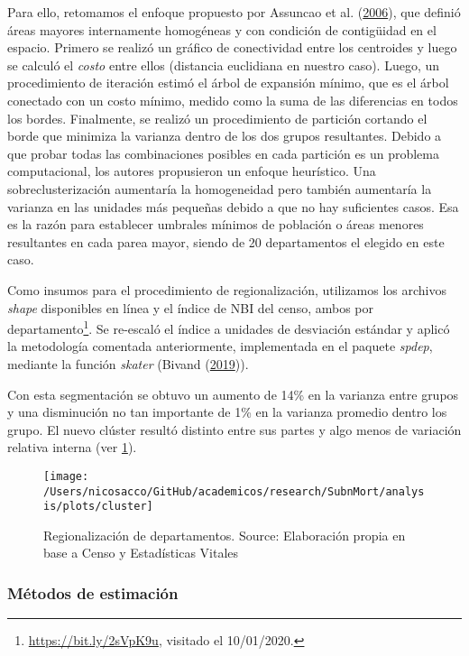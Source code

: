 \documentclass[12pt,]{article}
\begin{document}
Para ello, retomamos el enfoque propuesto por Assuncao et al.
(\protect\hyperlink{ref-AssunCao2006}{2006}), que definió áreas mayores
internamente homogéneas y con condición de contigüidad en el espacio.
Primero se realizó un gráfico de conectividad entre los centroides y
luego se calculó el \emph{costo} entre ellos (distancia euclidiana en
nuestro caso). Luego, un procedimiento de iteración estimó el árbol de
expansión mínimo, que es el árbol conectado con un costo mínimo, medido
como la suma de las diferencias en todos los bordes. Finalmente, se
realizó un procedimiento de partición cortando el borde que minimiza la
varianza dentro de los dos grupos resultantes. Debido a que probar todas
las combinaciones posibles en cada partición es un problema
computacional, los autores propusieron un enfoque heurístico. Una
sobreclusterización aumentaría la homogeneidad pero también aumentaría
la varianza en las unidades más pequeñas debido a que no hay suficientes
casos. Esa es la razón para establecer umbrales mínimos de población o
áreas menores resultantes en cada parea mayor, siendo de 20
departamentos el elegido en este caso.

Como insumos para el procedimiento de regionalización, utilizamos los
archivos \emph{shape} disponibles en línea y el índice de NBI del censo,
ambos por departamento\footnote{\url{https://bit.ly/2sVpK9u}, visitado
  el 10/01/2020.}. Se re-escaló el índice a unidades de desviación
estándar y aplicó la metodología comentada anteriormente, implementada
en el paquete \emph{spdep}, mediante la función \emph{skater} (Bivand
(\protect\hyperlink{ref-Bivand2019}{2019})).

Con esta segmentación se obtuvo un aumento de 14\% en la varianza entre
grupos y una disminución no tan importante de 1\% en la varianza
promedio dentro los grupo. El nuevo clúster resultó distinto entre sus
partes y algo menos de variación relativa interna (ver
\ref{fig:cluster}).

\begin{figure}

{\centering \texttt{[image: /Users/nicosacco/GitHub/academicos/research/SubnMort/analysis/plots/cluster]} 

}

\caption{Regionalización de departamentos. Source: Elaboración propia en base a Censo y Estadísticas Vitales}\label{fig:cluster}
\end{figure}

\hypertarget{muxe9todos-de-estimaciuxf3n}{%
\subsubsection{\texorpdfstring{\textbf{Métodos de
estimación}}{Métodos de estimación}}\label{muxe9todos-de-estimaciuxf3n}}
\end{document}
